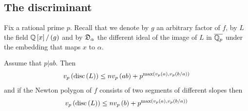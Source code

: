 \documentclass[../main.tex]{subfiles}
\begin{document}
  \subsection{The discriminant}
  Fix a rational prime $p$.
  Recall that we denote by $g$ an arbitrary factor of $f$, by $L$ the field $\mathbb{Q}\left[ x \right] / \left( g \right)$ and by $\mathfrak{D}_\alpha$ the different ideal of the image of $L$ in $\overline{\mathbb{Q}_p}$ under the embedding that maps $x$ to $\alpha$.
  \begin{proposition}
    \label{prop:discriminant_bound}
    Assume that $p | ab$.
    Then
    \[
      v_p\left( \operatorname{disc}\left( L \right) \right)
      \leq
      nv_p\left( ab \right) + p^{\max\left( v_p\left( a \right), v_p\left( b / a \right) \right)}
    \]
    and if the Newton polygon of $f$ consists of two segments of different slopes then  
    \[
      v_p\left( \operatorname{disc}\left( L \right) \right)
      \leq
      nv_p\left( b \right) + p^{\max\left( v_p\left( a \right), v_p\left( b / a \right) \right)}
    \]
  \end{proposition}
\end{document}

